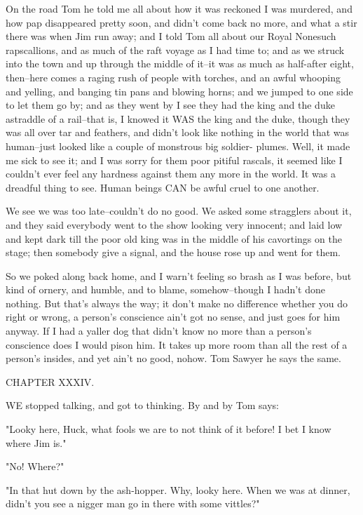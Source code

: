 On the road Tom he told me all about how it was reckoned I was murdered,
and how pap disappeared pretty soon, and didn't come back no more, and
what a stir there was when Jim run away; and I told Tom all about our
Royal Nonesuch rapscallions, and as much of the raft voyage as I had
time to; and as we struck into the town and up through the middle of
it--it was as much as half-after eight, then--here comes a raging rush of
people with torches, and an awful whooping and yelling, and banging tin
pans and blowing horns; and we jumped to one side to let them go by; and
as they went by I see they had the king and the duke astraddle of a
rail--that is, I knowed it WAS the king and the duke, though they was
all over tar and feathers, and didn't look like nothing in the world
that was human--just looked like a couple of monstrous big soldier-
plumes.  Well, it made me sick to see it; and I was sorry for them poor
pitiful rascals, it seemed like I couldn't ever feel any hardness
against them any more in the world.  It was a dreadful thing to see.
Human beings CAN be awful cruel to one another.

We see we was too late--couldn't do no good.  We asked some stragglers
about it, and they said everybody went to the show looking very innocent;
and laid low and kept dark till the poor old king was in the middle of
his cavortings on the stage; then somebody give a signal, and the house
rose up and went for them.

So we poked along back home, and I warn't feeling so brash as I was
before, but kind of ornery, and humble, and to blame, somehow--though I
hadn't done nothing.  But that's always the way; it don't make no
difference whether you do right or wrong, a person's conscience ain't got
no sense, and just goes for him anyway.  If I had a yaller dog that
didn't know no more than a person's conscience does I would pison him.
It takes up more room than all the rest of a person's insides, and yet
ain't no good, nohow.  Tom Sawyer he says the same.




CHAPTER XXXIV.

WE stopped talking, and got to thinking.  By and by Tom says:

"Looky here, Huck, what fools we are to not think of it before!  I bet I
know where Jim is."

"No!  Where?"

"In that hut down by the ash-hopper.  Why, looky here.  When we was at
dinner, didn't you see a nigger man go in there with some vittles?"

